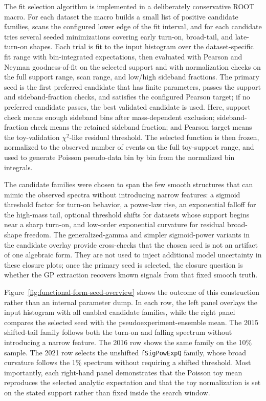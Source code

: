 The fit selection algorithm is implemented in a deliberately conservative ROOT macro. For each dataset the macro builds a small list of positive candidate families, scans the configured lower edge of the fit interval, and for each candidate tries several seeded minimizations covering early turn-on, broad-tail, and late-turn-on shapes. Each trial is fit to the input histogram over the dataset-specific fit range with bin-integrated expectations, then evaluated with Pearson and Neyman goodness-of-fit on the selected support and with normalization checks on the full support range, scan range, and low/high sideband fractions. The primary seed is the first preferred candidate that has finite parameters, passes the support and sideband-fraction checks, and satisfies the configured Pearson target; if no preferred candidate passes, the best validated candidate is used. Here, support check means enough sideband bins after mass-dependent exclusion; sideband-fraction check means the retained sideband fraction; and Pearson target means the toy-validation $\chi^2$-like residual threshold. The selected function is then frozen, normalized to the observed number of events on the full toy-support range, and used to generate Poisson pseudo-data bin by bin from the normalized bin integrals.

The candidate families were chosen to span the few smooth structures that can mimic the observed spectra without introducing narrow features: a sigmoid threshold factor for turn-on behavior, a power-law rise, an exponential falloff for the high-mass tail, optional threshold shifts for datasets whose support begins near a sharp turn-on, and low-order exponential curvature for residual broad-shape freedom. The generalized-gamma and simpler sigmoid-power variants in the candidate overlay provide cross-checks that the chosen seed is not an artifact of one algebraic form. They are not used to inject additional model uncertainty in these closure plots; once the primary seed is selected, the closure question is whether the GP extraction recovers known signals from that fixed smooth truth.

Figure~\ref{fig:functional-form-seed-overview} shows the outcome of this construction
rather than an internal parameter dump. In each row, the left panel overlays the input
histogram with all enabled candidate families, while the right panel compares the
selected seed with the pseudoexperiment-ensemble mean. The 2015 shifted-tail family
follows both the turn-on and falling spectrum without introducing a narrow feature. The
2016 row shows the same family on the 10\% sample. The 2021 row selects the unshifted
\texttt{fSigPowExpQ} family, whose broad curvature follows the 1\% spectrum without
requiring a shifted threshold. Most importantly, each right-hand panel demonstrates
that the Poisson toy mean reproduces the selected analytic expectation and that the toy
normalization is set on the stated support rather than fixed inside the search window.

